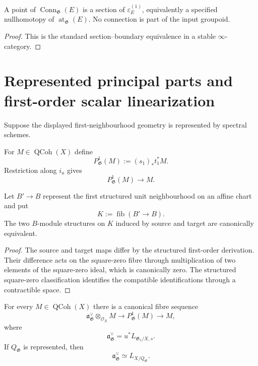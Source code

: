 \begin{proposition}
\label{prop:as-connection-atiyah}
A point of $\operatorname{Conn}_{\mathfrak G}(E)$ is a section of
$\varepsilon_E^{(1)}$, equivalently a specified nullhomotopy of
$\operatorname{at}_{\mathfrak G}(E)$.  No connection is part of the input
groupoid.
\end{proposition}

\begin{proof}
This is the standard section--boundary equivalence in a stable
$\infty$-category.
\end{proof}

\section{Represented principal parts and first-order scalar linearization}
\label{sec:as-principal-parts}

Suppose the displayed first-neighbourhood geometry is represented by spectral
schemes.

\begin{definition}
\label{def:as-qc-principal-parts}
For $M\in\operatorname{QCoh}(X)$ define
\[
\boxed{
    P^1_{\mathfrak G}(M)
    :=
    (s_1)_*t_1^*M.
}
\]
Restriction along $i_u$ gives
\[
    P^1_{\mathfrak G}(M)\longrightarrow M.
\]
\end{definition}

\begin{lemma}
\label{lem:as-square-zero-bimodule}
Let $B'\to B$ represent the first structured unit neighbourhood on an affine
chart and put
\[
    K:=\operatorname{fib}(B'\to B).
\]
The two $B$-module structures on $K$ induced by source and target are
canonically equivalent.
\end{lemma}

\begin{proof}
The source and target maps differ by the structured first-order derivation.
Their difference acts on the square-zero fibre through multiplication of two
elements of the square-zero ideal, which is canonically zero.  The
structured square-zero classification identifies the compatible
identifications through a contractible space.
\end{proof}

\begin{theorem}
\label{thm:as-principal-parts-cotangent}
For every $M\in\operatorname{QCoh}(X)$ there is a canonical fibre sequence
\[
\boxed{
    \mathfrak a_{\mathfrak G}^{\vee}
    \otimes_{\mathcal O_X}M
    \longrightarrow
    P^1_{\mathfrak G}(M)
    \longrightarrow
    M,
}
\]
where
\[
    \mathfrak a_{\mathfrak G}^{\vee}
    =
    u^*L_{\mathfrak G_1/X,s}.
\]
If $Q_{\mathfrak G}$ is represented, then
\[
    \mathfrak a_{\mathfrak G}^{\vee}
    \simeq
    L_{X/Q_{\mathfrak G}}.
\]
\end{theorem}

